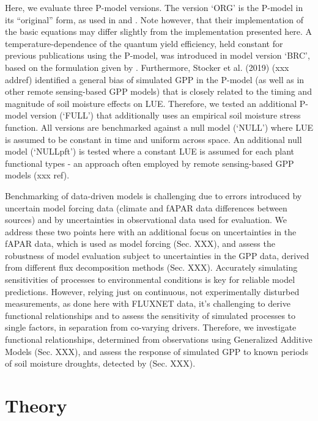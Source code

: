 \documentclass{myreport}
\begin{document}
Here, we evaluate three P-model versions. The version `ORG' is the P-model in its ``original'' form, as used in \cite{wang17natpl} and \cite{keenan17natcomm}. Note however, that their implementation of the basic equations may differ slightly from the implementation presented here. A temperature-dependence of the quantum yield efficiency, held constant for previous publications using the P-model, was introduced in model version `BRC', based on the formulation given by \cite{bernacchi03pce}. Furthermore, Stocker et al. (2019) (xxx addref) identified a general bias of simulated GPP in the P-model (as well as in other remote sensing-based GPP models) that is closely related to the timing and magnitude of soil moisture effects on LUE. Therefore, we tested an additional P-model version (`FULL') that additionally uses an empirical soil moisture stress function. All versions are benchmarked against a null model (`NULL') where LUE is assumed to be constant in time and uniform across space. An additional null model (`NULLpft') is tested where a constant LUE is assumed for each plant functional types - an approach often employed by remote sensing-based GPP models (xxx ref).

Benchmarking of data-driven models is challenging due to errors introduced by uncertain model forcing data \citep{ryu19rse} (climate and fAPAR data differences between sources) and by uncertainties in observational data used for evaluation. We address these two points here with an additional focus on uncertainties in the fAPAR data, which is used as model forcing (Sec. XXX), and assess the robustness of model evaluation subject to uncertainties in the GPP data, derived from different flux decomposition methods (Sec. XXX). Accurately simulating sensitivities of processes to environmental conditions is key for reliable model predictions. However, relying just on continuous, not experimentally disturbed measurements, as done here with FLUXNET data, it's challenging to derive functional relationships and to assess the sensitivity of simulated processes to single factors, in separation from co-varying drivers. Therefore, we investigate functional relationships, determined from observations using Generalized Additive Models (Sec. XXX), and assess the response of simulated GPP to known periods of soil moisture droughts, detected by \cite{stocker18newphyt} (Sec. XXX).

\section{Theory}
\label{sec:theory}
\end{document}
